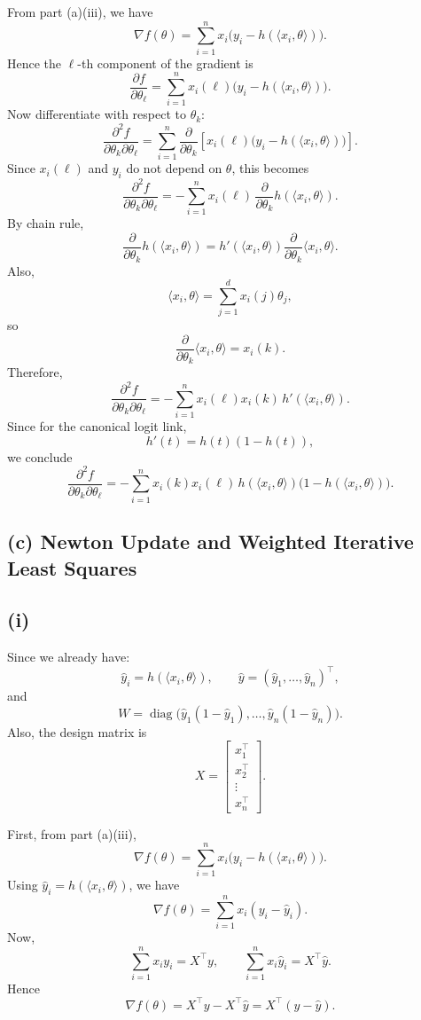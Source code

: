 \documentclass{article}
\begin{document}
From part (a)(iii), we have
\[
\nabla f(\theta)=\sum_{i=1}^n x_i\bigl(y_i-h(\langle x_i,\theta\rangle)\bigr).
\]
Hence the \(\ell\)-th component of the gradient is
\[
\frac{\partial f}{\partial \theta_\ell}
=
\sum_{i=1}^n x_i(\ell)\bigl(y_i-h(\langle x_i,\theta\rangle)\bigr).
\]
Now differentiate with respect to \(\theta_k\):
\[
\frac{\partial^2 f}{\partial\theta_k\partial\theta_\ell}
=
\sum_{i=1}^n
\frac{\partial}{\partial\theta_k}
\left[
x_i(\ell)\bigl(y_i-h(\langle x_i,\theta\rangle)\bigr)
\right].
\]
Since \(x_i(\ell)\) and \(y_i\) do not depend on \(\theta\), this becomes
\[
\frac{\partial^2 f}{\partial\theta_k\partial\theta_\ell}
=
-\sum_{i=1}^n x_i(\ell)\,
\frac{\partial}{\partial\theta_k}h(\langle x_i,\theta\rangle).
\]
By chain rule,
\[
\frac{\partial}{\partial\theta_k}h(\langle x_i,\theta\rangle)
=
h'(\langle x_i,\theta\rangle)
\frac{\partial}{\partial\theta_k}\langle x_i,\theta\rangle.
\]
Also,
\[
\langle x_i,\theta\rangle=\sum_{j=1}^d x_i(j)\theta_j,
\]
so
\[
\frac{\partial}{\partial\theta_k}\langle x_i,\theta\rangle=x_i(k).
\]
Therefore,
\[
\frac{\partial^2 f}{\partial\theta_k\partial\theta_\ell}
=
-\sum_{i=1}^n x_i(\ell)x_i(k)\,h'(\langle x_i,\theta\rangle).
\]
Since for the canonical logit link,
\[
h'(t)=h(t)(1-h(t)),
\]
we conclude
\[
\frac{\partial^2 f}{\partial\theta_k\partial\theta_\ell}
=
-\sum_{i=1}^n x_i(k)x_i(\ell)\,h(\langle x_i,\theta\rangle)\bigl(1-h(\langle x_i,\theta\rangle)\bigr).
\]

\subsection*{(c) Newton Update and Weighted Iterative Least Squares}
\subsection*{(i)}
Since we already have:
\[
\hat y_i=h(\langle x_i,\theta\rangle),
\qquad
\hat y=(\hat y_1,\dots,\hat y_n)^\top,
\]
and
\[
W=\operatorname{diag}\bigl(\hat y_1(1-\hat y_1),\dots,\hat y_n(1-\hat y_n)\bigr).
\]
Also, the design matrix is
\[
X=
\begin{bmatrix}
x_1^\top\\
x_2^\top\\
\vdots\\
x_n^\top
\end{bmatrix}.
\]

First, from part (a)(iii),
\[
\nabla f(\theta)=\sum_{i=1}^n x_i\bigl(y_i-h(\langle x_i,\theta\rangle)\bigr).
\]
Using \(\hat y_i=h(\langle x_i,\theta\rangle)\), we have
\[
\nabla f(\theta)=\sum_{i=1}^n x_i(y_i-\hat y_i).
\]
Now,
\[
\sum_{i=1}^n x_i y_i = X^\top y,
\qquad
\sum_{i=1}^n x_i \hat y_i = X^\top \hat y.
\]
Hence
\[
\nabla f(\theta)=X^\top y - X^\top \hat y = X^\top (y-\hat y).
\]
\end{document}
